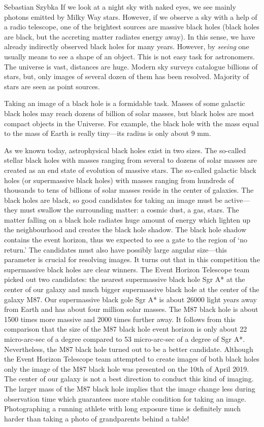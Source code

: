 \begin{artengenv}{Sebastian Szybka}
If we look at a night sky with naked eyes, we see mainly photons emitted by Milky Way stars. However, if we observe a sky with a help of a radio telescope, one of the brightest sources are massive black holes (black holes are black, but the accreting matter radiates energy away). In this sense, we have already indirectly observed black holes for many years. However, by \textit{seeing} one usually means to see a shape of an object. This is not easy task for astronomers. The universe is vast, distances are huge. Modern sky surveys catalogue billions of stars, but, only images of several dozen of them has been resolved. Majority of stars are seen as point sources. 

Taking an image of a black hole is a formidable task. Masses of some galactic black holes may reach dozens of billion of solar masses, but black holes are most compact objects in the Universe. For example, the black hole with the mass equal to the mass of Earth is really tiny---its radius is only about $9$ mm. 

As we known today, astrophysical black holes exist in two sizes. The so-called stellar black holes with masses ranging from several to dozens of solar masses are created as an end state of evolution of massive stars. The so-called galactic black holes (or supermassive black holes) with masses ranging from hundreds of thousands to tens of billions of solar masses reside in the center of galaxies. The black holes are black, so good candidates for taking an image must be active---they must swallow the surrounding matter:  a cosmic dust, a gas, stars. The matter falling on a black hole radiates huge amount of energy which lighten up the neighbourhood and creates the black hole shadow. The black hole shadow contains the event horizon, thus we expected to see a gate to the region of `no return.' The candidates must also have possibly large angular size---this parameter is crucial for resolving images. It turns out that in this competition the supermassive black holes are clear winners. The Event Horizon Telescope team picked out two candidates: the nearest supermassive black hole Sgr A* at the center of our galaxy and much bigger supermassive black hole at the center of the galaxy M87. Our supermassive black gole Sgr A* is about 26000 light years away from Earth and has about four million solar masses. The M87 black hole is about 1500 times more massive and 2000 times further away. It follows from this comparison that the size of the M87 black hole event horizon is only about 22 micro-arc-sec of a degree compared to 53 micro-arc-sec of a degree of Sgr A*. Nevertheless, the M87 black hole turned out to be a better candidate. Although the Event Horizon Telescope team attempted to create images of both black holes only the image of the M87 black hole was presented on the 10th of April 2019. The center of our galaxy is not a best direction to conduct this kind of imaging. The larger mass of the M87 black hole implies that the image change less during observation time which guarantees more stable condition for taking an image. Photographing a running athlete with long exposure time is definitely much harder than taking a photo of grandparents behind a table!


\end{artengenv}
